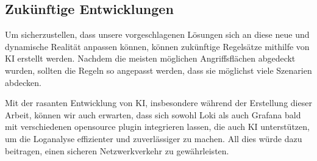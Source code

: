 \subsection{Zukünftige Entwicklungen}
Um sicherzustellen, dass unsere vorgeschlagenen Lösungen sich an diese neue und dynamische Realität anpassen können, können zukünftige Regelsätze mithilfe von \gls{KI} erstellt werden. Nachdem die meisten möglichen Angriffsflächen abgedeckt wurden, sollten die Regeln so angepasst werden, dass sie möglichst viele Szenarien abdecken.


Mit der rasanten Entwicklung von \gls{KI}, insbesondere während der Erstellung dieser Arbeit, können wir auch erwarten, dass sich sowohl Loki als auch Grafana bald mit verschiedenen \gls{opensource} \gls{plugin} integrieren lassen, die auch \gls{KI} unterstützen, um die Loganalyse effizienter und zuverlässiger zu machen. All dies würde dazu beitragen, einen sicheren Netzwerkverkehr zu gewährleisten.


